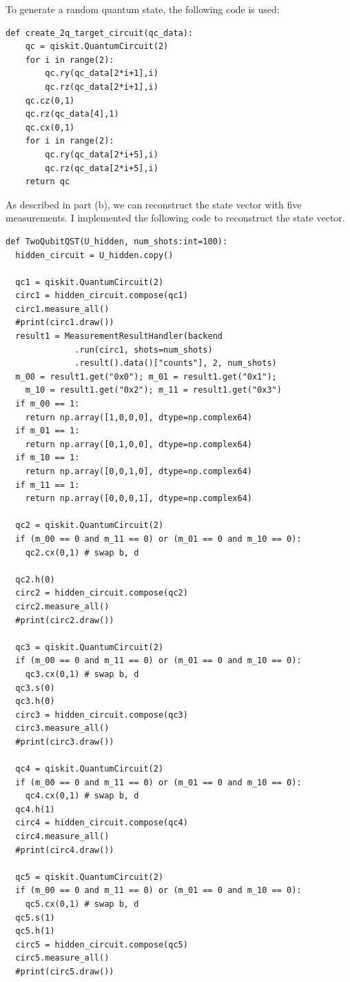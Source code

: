\documentclass[a4paper, 11pt]{article}
\begin{document}
To generate a random quantum state, the following code is used:
\begin{verbatim}
def create_2q_target_circuit(qc_data):
    qc = qiskit.QuantumCircuit(2)
    for i in range(2):
        qc.ry(qc_data[2*i+1],i)
        qc.rz(qc_data[2*i+1],i)
    qc.cz(0,1)
    qc.rz(qc_data[4],1)
    qc.cx(0,1)
    for i in range(2):
        qc.ry(qc_data[2*i+5],i)
        qc.rz(qc_data[2*i+5],i)
    return qc
\end{verbatim}

As described in part (b), we can reconstruct the state vector with five measurements. I implemented the following code to reconstruct the state vector.
\begin{verbatim}
def TwoQubitQST(U_hidden, num_shots:int=100):
  hidden_circuit = U_hidden.copy()
  
  qc1 = qiskit.QuantumCircuit(2)
  circ1 = hidden_circuit.compose(qc1)
  circ1.measure_all()
  #print(circ1.draw())
  result1 = MeasurementResultHandler(backend
              .run(circ1, shots=num_shots)
              .result().data()["counts"], 2, num_shots)
  m_00 = result1.get("0x0"); m_01 = result1.get("0x1"); 
    m_10 = result1.get("0x2"); m_11 = result1.get("0x3") 
  if m_00 == 1:
    return np.array([1,0,0,0], dtype=np.complex64)
  if m_01 == 1:
    return np.array([0,1,0,0], dtype=np.complex64)
  if m_10 == 1:
    return np.array([0,0,1,0], dtype=np.complex64)
  if m_11 == 1:
    return np.array([0,0,0,1], dtype=np.complex64)
  
  qc2 = qiskit.QuantumCircuit(2)
  if (m_00 == 0 and m_11 == 0) or (m_01 == 0 and m_10 == 0):
    qc2.cx(0,1) # swap b, d

  qc2.h(0)
  circ2 = hidden_circuit.compose(qc2)
  circ2.measure_all()
  #print(circ2.draw())
  
  qc3 = qiskit.QuantumCircuit(2)
  if (m_00 == 0 and m_11 == 0) or (m_01 == 0 and m_10 == 0):
    qc3.cx(0,1) # swap b, d
  qc3.s(0)
  qc3.h(0)
  circ3 = hidden_circuit.compose(qc3)
  circ3.measure_all()
  #print(circ3.draw())

  qc4 = qiskit.QuantumCircuit(2)
  if (m_00 == 0 and m_11 == 0) or (m_01 == 0 and m_10 == 0):
    qc4.cx(0,1) # swap b, d
  qc4.h(1)
  circ4 = hidden_circuit.compose(qc4)
  circ4.measure_all()
  #print(circ4.draw())
  
  qc5 = qiskit.QuantumCircuit(2)
  if (m_00 == 0 and m_11 == 0) or (m_01 == 0 and m_10 == 0):
    qc5.cx(0,1) # swap b, d
  qc5.s(1)
  qc5.h(1)
  circ5 = hidden_circuit.compose(qc5)
  circ5.measure_all()
  #print(circ5.draw())
  

\end{verbatim}
\end{document}
